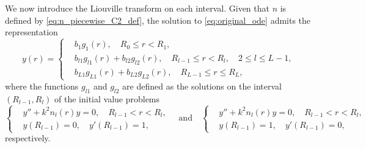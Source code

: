\documentclass[11pt,reqno]{amsart}
\theoremstyle{definition}
\theoremstyle{remark}
\numberwithin{equation}{section}
\begin{document}
We now introduce the Liouville transform on each interval. Given that $n$ is defined by \eqref{eq:n_piecewise_C2_def}, the solution to \eqref{eq:original_ode} admits the representation
\begin{equation}\label{eq:general_form_ode_solution_y}
	y(r)=\left\{
	\begin{aligned}
		&b_1 g_1(r), \quad R_0 \leq r < R_1, \\
		&b_{l1} g_{l1}(r) + b_{l2} g_{l2}(r), \quad  R_{l-1} \leq r< R_l, \quad 2 \leq l \leq L-1,\\
		&b_{L1} g_{L1}(r) + b_{L2} g_{L2}(r), \quad  R_{L-1} \leq r \leq R_L,
	\end{aligned}
	\right.
\end{equation}
where the functions $g_{l1}$ and $g_{l2}$ are defined as the solutions on the interval $(R_{l-1}, R_l)$ of the initial value problems
\begin{equation}\label{eq:ode_y_n_j}
	\left\{
	\begin{aligned}
		&y'' + k^2 n_l(r) y = 0, \quad  R_{l-1} <r< R_l, \\
		&y(R_{l-1}) = 0, \quad y'(R_{l-1}) = 1,
	\end{aligned}
	\right.
	\quad \mbox{and} \quad
	\left\{
	\begin{aligned}
		&y'' + k^2 n_l(r) y = 0, \quad  R_{l-1} < r< R_l, \\
		&y(R_{l-1}) = 1, \quad y'(R_{l-1}) = 0,
	\end{aligned}
	\right.
\end{equation}
respectively.
\end{document}
